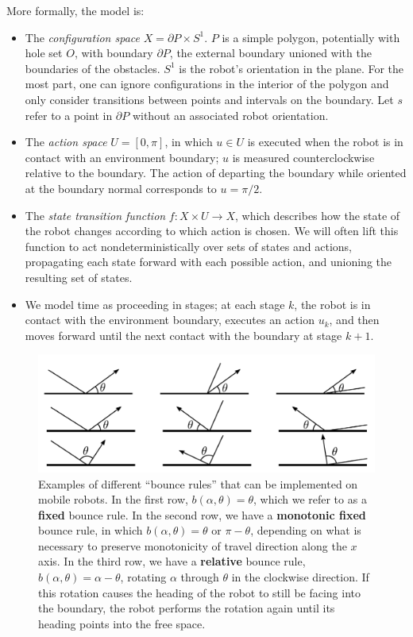 \documentclass[]{styles/svproc}  %
\begin{document}
More formally, the model is:
\begin{itemize}
\item The \emph{configuration space} $X = \partial P \times S^1$. $P$ is a simple polygon,
potentially with hole set $O$, with boundary $\partial P$, the external boundary
unioned with the boundaries of the obstacles. $S^1$ is the robot's orientation in the plane. For the most part, one can ignore configurations in the interior
of the polygon and only consider transitions between points and intervals on the
boundary. Let $s$ refer to a point in $\partial P$ without an associated robot orientation.
\item The \emph{action space} $U = [0,\pi]$, in which $u \in U$ is executed when
the robot is in contact with an environment boundary; $u$ is measured counterclockwise
relative to the boundary. The action of departing the boundary while oriented at the boundary
normal corresponds to $u = \pi/2$.
\item The \emph{state transition function} $f: X \times U \to X$, which
describes how the state of the robot changes according to which action is
chosen. We will often lift this function to act nondeterministically over sets
of states and actions, propagating each state forward with each possible action,
and unioning the resulting set of states. 
\item We model time as proceeding in stages; at each stage $k$, the robot
is in contact with the environment boundary, executes an action $u_k$, and then
moves forward until the next contact with the boundary at stage $k+1$.
\end{itemize}

\begin{figure}
    \includegraphics[width=0.8\linewidth]{figures/bounce_examples.pdf}
    \centering
    \caption[test]{\label{fig:bex}Examples of different ``bounce rules'' that can be implemented on
mobile robots. In the first row, $b(\alpha, \theta) = \theta$, which we refer to
as a \textbf{fixed} bounce rule. In the second row, we have a \textbf{monotonic
fixed} bounce rule, in which
$b(\alpha, \theta) = \theta$ or $\pi-\theta$, depending on what is necessary to
preserve monotonicity of travel direction along the $x$ axis. In the third
row, we have a \textbf{relative} bounce rule, $b(\alpha, \theta) = \alpha - \theta$, rotating $\alpha$ through $\theta$ in the clockwise
direction. If this rotation causes the 
heading of the robot to still be facing into the boundary, the robot 
performs the rotation again until its heading points into the free space.
}
\end{figure}
\end{document}
